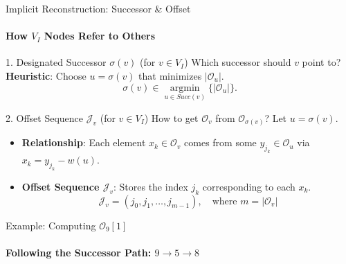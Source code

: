 \begin{frame}{Implicit Reconstruction: Successor \& Offset}
    \framesubtitle{How $V_I$ Nodes Refer to Others}

    \begin{block}{1. Designated Successor $\sigma(v)$ (for $v \in V_I$)}
        Which successor should $v$ point to?
        \textbf{Heuristic}: Choose $u = \sigma(v)$ that minimizes $|\mathcal{O}_u|$.
        \[ \sigma(v) \in \underset{u \in Succ(v)}{\operatorname{argmin}} \{ |\mathcal{O}_u| \}. \]
    \end{block}
    \begin{block}{2. Offset Sequence $\mathcal{J}_v$ (for $v \in V_I$)}
        How to get $\mathcal{O}_v$ from $\mathcal{O}_{\sigma(v)}$? Let $u=\sigma(v)$.
        \begin{itemize}
            \item \textbf{Relationship}: Each element $x_k \in \mathcal{O}_v$ comes from some $y_{j_k} \in \mathcal{O}_u$ via $x_k = y_{j_k} - w(u)$.
            \item \textbf{Offset Sequence $\mathcal{J}_v$}: Stores the index $j_k$ corresponding to each $x_k$.
                  \[ \mathcal{J}_v = (j_0, j_1, \dots, j_{m-1}), \quad \text{where } m = |\mathcal{O}_v| \]
        \end{itemize}
    \end{block}

\end{frame}


\begin{frame}{Example: Computing $\mathcal{O}_9[1]$}
    \framesubtitle{Following the Successor Path: $9 \to 5 \to 8$}
    \begin{figure}[hbtp]
        \centering
    \end{figure}
\end{frame}

